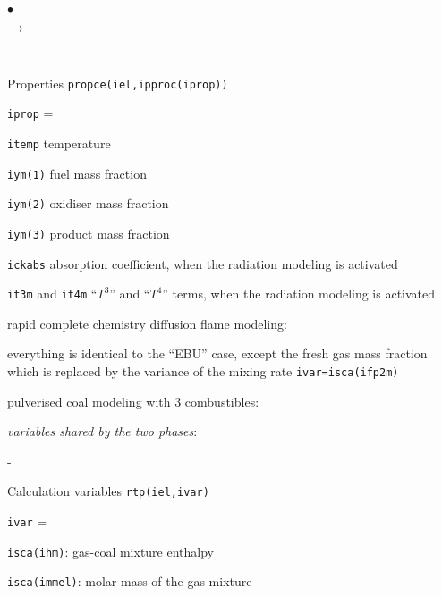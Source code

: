 {{{\begin{list}{$\bullet$}{}
\begin{list}{$\rightarrow$}{}
\begin{list}{-}{}
        \item Properties \texttt{propce(iel,ipproc(iprop))}
              \begin{list}{\texttt{iprop} = }{}
               \item \texttt{itemp} temperature
               \item \texttt{iym(1)} fuel mass fraction
               \item \texttt{iym(2)} oxidiser mass fraction
               \item \texttt{iym(3)} product mass fraction
               \item \texttt{ickabs} absorption
                     coefficient, when the radiation modeling is
                     activated
               \item \texttt{it3m} and \texttt{it4m}
                     ``$T^3$'' and ``$T^4$'' terms, when the radiation
                     modeling is activated
              \end{list}
       \end{list}
       \item rapid complete chemistry diffusion flame modeling:
             \begin{list}{}{}
              \item  everything is identical to the ``EBU'' case, except
                     the fresh gas mass fraction which is replaced by the
                     variance of the mixing rate \texttt{ivar=isca(ifp2m)}
             \end{list}
       \item pulverised coal modeling with 3 combustibles:
             \begin{list}{}{}
              \item {\em variables shared by the two phases}:
                    \begin{list}{-}{}
                     \item Calculation variables \texttt{rtp(iel,ivar)}
                           \begin{list}{\texttt{ivar} = }{}
                            \item \texttt{isca(ihm)}: gas-coal mixture enthalpy
                            \item \texttt{isca(immel)}: molar mass of the
                                  gas mixture
                           \end{list}

\end{list}
\end{list}
\end{list}
\end{list}}}}
